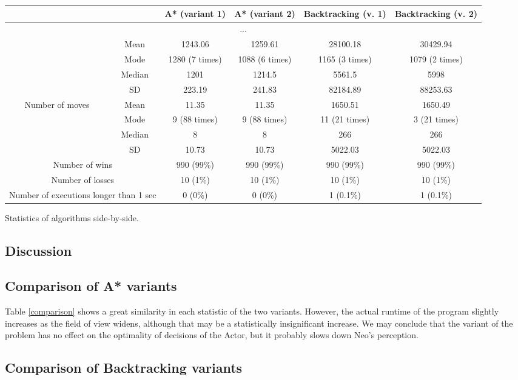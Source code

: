 \documentclass[10pt]{article}
\begin{document}
\begin{longtable}[c]{|c|c|c|c|c|c|}
	\hline
	\multicolumn{2}{|c|}{} & \textbf{A* (variant 1)} & \textbf{A* (variant 2)} & \textbf{Backtracking (v. 1)} & \textbf{Backtracking (v. 2)}\\
	\hline
	\endhead
	\multicolumn{6}{|c|}{...}\\ \endfoot
	\endlastfoot
	\multirow{4}{3cm}{Execution time, $\mu s$} & Mean & 1243.06 & 1259.61 & 28100.18 & 30429.94 \\\cline{2-6}
	& Mode & 1280 (7 times) & 1088 (6 times) & 1165 (3 times) & 1079 (2 times) \\\cline{2-6}
	& Median & 1201 & 1214.5 & 5561.5 & 5998 \\\cline{2-6}
	& SD & 223.19 & 241.83 & 82184.89 & 88253.63 \\\hline
	\multirow{4}{3cm}{Number of moves} & Mean & 11.35 & 11.35 & 1650.51 & 1650.49 \\\cline{2-6}
	& Mode & 9 (88 times) & 9 (88 times) & 11 (21 times) & 3 (21 times) \\\cline{2-6}
	& Median & 8 & 8 & 266 & 266 \\\cline{2-6}
	& SD & 10.73 & 10.73 & 5022.03 & 5022.03 \\\hline
	\multicolumn{2}{|c|}{Number of wins} & 990 (99\%) & 990 (99\%) & 990 (99\%) & 990 (99\%) \\\hline
	\multicolumn{2}{|c|}{Number of losses} & 10 (1\%) & 10 (1\%)  & 10 (1\%) & 10 (1\%) \\\hline
	\multicolumn{2}{|c|}{Number of executions longer than 1 sec} & 0 (0\%) & 0 (0\%) & 1 (0.1\%) & 1 (0.1\%)\\\hline
	
\end{longtable}
\begin{table}[!h]
	\caption{Statistics of algorithms side-by-side.} \label{comparison}
\end{table}

\subsection{Discussion}
\subsection{Comparison of A* variants}
Table \ref{comparison} shows a great similarity in each statistic of the two variants. However, the actual runtime of the program slightly increases as the field of view widens, although that may be a statistically insignificant increase. We may conclude that the variant of the problem has no effect on the optimality of decisions of the Actor, but it probably slows down Neo's perception.

\subsection{Comparison of Backtracking variants}
\end{document}

